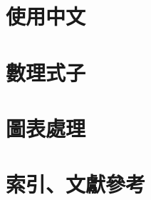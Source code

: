 \documentclass[11pt,a4paper]{article}
\begin{document}
\section{使用中文}
\label{sec:chinese}

\section{數理式子}
\label{sec:math}

\section{圖表處理}
\label{sec:figure}

\section{索引、文獻參考}
\label{sec:index}

\clearpage
\hypertarget{contents}{}
\tableofcontents
\end{document}

